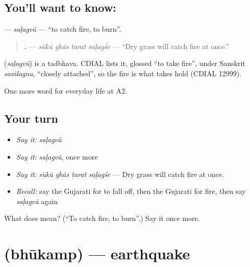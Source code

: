 \subsection*{You'll want to know: }
\textbf{} — \emph{saḷagvũ} — \textquotedblleft{}to catch fire, to burn\textquotedblright{}.

\begin{quote}
\textbf{   .} — \emph{sūkũ ghās tarat saḷagśe} — \textquotedblleft{}Dry grass will catch fire at once.\textquotedblright{}
\end{quote}

\begin{cousinweb}
\textbf{} (\emph{saḷagvũ}) is a tadbhava. CDIAL lists it, glossed \textquotedblleft{}to take fire\textquotedblright{}, under Sanskrit \emph{saṁlagna}, \textquotedblleft{}closely attached\textquotedblright{}, so the fire is what takes hold (CDIAL 12999).
\end{cousinweb}

\begin{grammarlens}[title={What you've built}]
One more word for everyday life at A2.
\end{grammarlens}

\subsection*{Your turn}
\begin{itemize}
\raggedright
  \item \emph{Say it:} \emph{saḷagvũ}
  \item \emph{Say it:} \emph{saḷagvũ}, once more
  \item \emph{Say it:} \emph{sūkũ ghās tarat saḷagśe} — Dry grass will catch fire at once.
  \item \emph{Recall:} say the Gujarati for to fall off, then the Gujarati for fire, then say \emph{saḷagvũ} again
\end{itemize}

\begin{tcolorbox}[breakable,colback=teal!4,colframe=teal!35!black,title={Before you move on}]
What does  mean? (\textquotedblleft{}To catch fire, to burn\textquotedblright{}.) Say it once more.
\end{tcolorbox}
\section[\texorpdfstring{\gu{ભૂકંપ} (bhūkamp)}{ભૂકંપ (bhūkamp)}]{ (bhūkamp) — earthquake}

